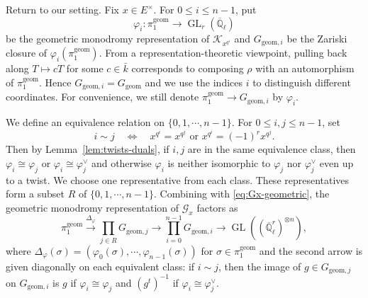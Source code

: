 \documentclass[11pt]{amsart}
\theoremstyle{remark}
\newcommand{\Ql}{\overline{\mathbb Q}_{\ell}}
\newcommand{\cK}{\mathcal K}
\newcommand{\cG}{\mathcal G}
\newcommand{\geom}{\mathrm{geom}}
\def\GL{\operatorname{GL}}
\begin{document}
Return to our setting. Fix $x\in E^{\times}$. For $0\le i\le n-1$, put 
\[
\varphi_i: \pi_1^{\geom}\longrightarrow \GL_r(\Ql)
\]
be the geometric monodromy representation of $\cK_{x^{q^i}}$ and $G_{\geom,i}$ be the Zariski closure of $\varphi_i(\pi_1^{\geom})$. From a representation-theoretic viewpoint, pulling back along $T\mapsto cT$ for some $c\in\bar{k}$ corresponds to composing $\rho$ with an automorphism of $\pi_1^{\geom}$. Hence $G_{\geom,i}=G_{\geom}$ and we use the indices $i$ to distinguish different coordinates. For convenience, we still denote $\pi_1^{\geom}\rightarrow G_{\geom,i}$ by $\varphi_i$. 

We define an equivalence relation on $\{0,1,\cdots,n-1\}$. For $0\le i,j\le n-1$, set
\[
    i\sim j\quad\Longleftrightarrow\quad x^{q^i}=x^{q^j}\text{ or }x^{q^i}=(-1)^r x^{q^j}.
\]
Then by Lemma~\ref{lem:twists-duals}, if $i,j$ are in the same equivalence class, then $\varphi_i\cong\varphi_j$ or $\varphi_i\cong\varphi_j^\vee$ and otherwise $\varphi_i$ is neither isomorphic to $\varphi_j$ nor $\varphi_j^\vee$ even up to a twist. We choose one representative from each class. These representatives form a subset $R$ of $\{0,1,\cdots,n-1\}$. Combining with \eqref{eq:Gx-geometric}, the geometric monodromy representation of $\cG_x$ factors as
\begin{equation}\label{factor}
\pi_1^{\geom}\xrightarrow{\Delta_\varphi}\prod_{j\in R}G_{\geom,j}\longrightarrow\prod_{i=0}^{n-1}G_{\geom,i}\longrightarrow\GL((\Ql^r)^{\otimes n}),
\end{equation}
where $\Delta_\varphi(\sigma)=(\varphi_0(\sigma),\cdots,\varphi_{n-1}(\sigma))$ for $\sigma\in\pi_1^{\geom}$ and the second arrow is given diagonally on each equivalent class: if $i\sim j$, then the image of $g\in G_{\geom,j}$ on $G_{\geom,i}$ is $g$ if $\varphi_i\cong\varphi_j$ and $(g^t)^{-1}$ if $\varphi_i\cong\varphi_j^\vee$.
\end{document}
